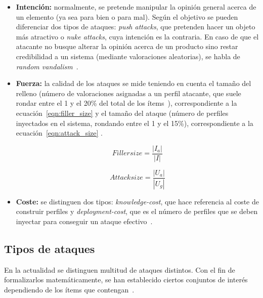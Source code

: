 \begin{itemize}
	
	\item \textbf{Intención:} normalmente, se pretende manipular la opinión general acerca de un elemento (ya sea para bien o para mal). Según el objetivo se pueden diferenciar dos tipos de ataques: \textit{push attacks}, que pretenden hacer un objeto más atractivo o \textit{nuke attacks}, cuya intención es la contraria. En caso de que el atacante no busque alterar la opinión acerca de un producto sino restar credibilidad a un sistema (mediante valoraciones aleatorias), se habla de \textit{random vandalism}~\cite{Burke2015RobustCollaborative}.
	
	\item \textbf{Fuerza:} la calidad de los ataques se mide teniendo en cuenta el tamaño del relleno (número de valoraciones asignadas a un perfil atacante, que suele rondar entre el 1 y el 20\% del total de los ítems~\cite{mingdan2018ShillingAttacksAReview}), correspondiente a la ecuación~\ref{eqn:filler_size}  y el tamaño del ataque (número de perfiles inyectados en el sistema, rondando entre el 1 y el 15\%), correspondiente a la ecuación~\ref{eqn:attack_size} .
	
	\begin{equation}\label{eqn:filler_size} Filler size = \frac{|I_a|}{|I|}\end{equation}
	
	\begin{equation}\label{eqn:attack_size} Attack size = \frac{|U_a|}{|U_g|}\end{equation}
	
	\item \textbf{Coste:} se distinguen dos tipos: \textit{knowledge-cost}, que hace referencia al coste de construir perfiles y \textit{deployment-cost}, que es el número de perfiles que se deben inyectar para conseguir un ataque efectivo~\cite{Mobasher2006Thesis}.
	
\end{itemize}

\subsection{Tipos de ataques}
\label{sec:tipos_ataques_recomendacion}

En la actualidad se distinguen multitud de ataques distintos. Con el fin de formalizarlos matemáticamente, se han establecido ciertos conjuntos de interés dependiendo de los ítems que contengan~\cite{zhou2021SemisupervisedRecommendationAttack}.

